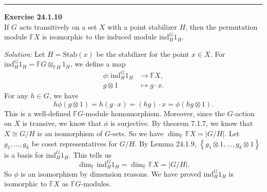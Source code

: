 \documentclass[a4paper, 12pt]{article}
\newenvironment{problem}[2][Exercise]
    { \begin{mdframed}[backgroundcolor=gray!20] \textbf{#1 #2} \\}
    {  \end{mdframed}}
\newenvironment{solution}
    {\textit{Solution:}}
    {}
\newcommand{\ind}{\text{ind}}
\begin{document}
\noindent\rule{7in}{2.8pt}
\begin{problem}{24.1.10}
If \(G\) acts transitively on a set \(X\) with a point stabilizer \(H\), then the permutation module \(\mathbb{F}X\) is isomorphic to the induced module \(\ind^G_H 1_H\).
\end{problem}
\begin{solution}
Let \(H=\text{Stab}(x)\) be the stabilizer for the point \(x\in X\). For \(\ind^G_H1_H=\mathbb{F}G\otimes_{\mathbb{F}H}1_H\), we define a map 
\begin{align*}
	\phi:\ind^G_H1_H&\rightarrow \mathbb{F}X,\\ 
	     g\otimes 1&\mapsto g\cdot x.
\end{align*}
For any \(h\in G\), we have 
\[h\phi(g\otimes 1)=h(g\cdot x)=(hg)\cdot x=\phi(hg\otimes 1).\]
This is a well-defined \(\mathbb{F}G\)-module homomorphism. Moreover, since the \(G\)-action on \(X\) is transive, we know that \(\phi\) is surjective. By theorem 7.1.7, we know that \(X\cong G/H\) is an isomorphism of \(G\)-sets. So we have \(\dim_\mathbb{F}\mathbb{F}X=|G/H|\). Let \(g_1,\ldots,g_k\) be coset 
representatives for \(G/H\). By Lemma 24.1.9, \(\left\{ g_1\otimes 1,\ldots,g_k\otimes 1 \right\}\) is a basis for \(\ind^G_H1_H\). This tells us 
\[\dim_\mathbb{F}\ind^G_H1_H=\dim_\mathbb{F}\mathbb{F}X=|G/H|.\]
So \(\phi\) is an isomorphism by dimension reasons. We have proved \(\ind^G_H1_H\) is isomorphic to \(\mathbb{F}X\) as \(\mathbb{F}G\)-modules.
\end{solution}
\end{document}
